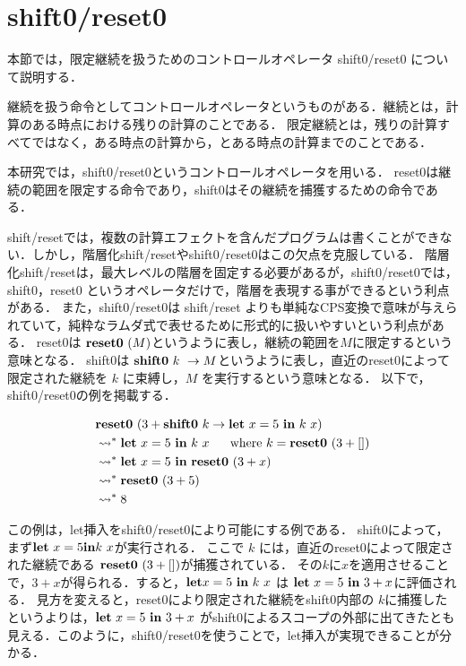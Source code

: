 \section{shift0/reset0}
本節では，限定継続を扱うためのコントロールオペレータ shift0/reset0 について説明する．

継続を扱う命令としてコントロールオペレータというものがある．継続とは，計算のある時点における残りの計算のことである．
限定継続とは，残りの計算すべてではなく，ある時点の計算から，とある時点の計算までのことである．

本研究では，shift0/reset0というコントロールオペレータを用いる．
reset0は継続の範囲を限定する命令であり，shift0はその継続を捕獲するための命令である．

shift/reset\cite{Danvy1990}では，複数の計算エフェクトを含んだプログラムは書くことができない．しかし，階層化shift/resetやshift0/reset0はこの欠点を克服している．
階層化shift/reset\cite{Danvy1990}は，最大レベルの階層を固定する必要があるが，shift0/reset0では，shift0，reset0 というオペレータだけで，階層を表現する事ができるという利点がある．
また，shift0/reset0は shift/reset よりも単純なCPS変換で意味が与えられていて，純粋なラムダ式で表せるために形式的に扱いやすいという利点がある．
reset0は $\textbf{reset0}~ (M)$というように表し，継続の範囲を$M$に限定するという意味となる．
shift0は $\textbf{shift0}~ k~ \to M$というように表し，直近のreset0によって限定された継続を $k$ に束縛し，$M$ を実行するという意味となる．
以下で，shift0/reset0の例を掲載する．

\begin{align*}
  &\textbf{reset0}~ (3 + \textbf{shift0}~ k \to \textbf{let}~ x = 5~ \textbf{in}~ k~ x) \\
  &\leadsto^* \textbf{let}~ x = 5~ \textbf{in}~ k~ x ~~~~~\text{where}~k = \textbf{reset0}~ (3 + []) \\
  &\leadsto^* \textbf{let}~ x = 5~ \textbf{in}~ \textbf{reset0}~ (3 + x) \\
  &\leadsto^* \textbf{reset0}~ (3 + 5) \\
  &\leadsto^* 8 \\
\end{align*}

この例は，let挿入をshift0/reset0により可能にする例である．
shift0によって，まず$\textbf{let}~ x = 5 \textbf{in} k~ x$が実行される．
ここで $k$ には，直近のreset0によって限定された継続である $\textbf{reset0}~ (3 + [])$が捕獲されている．
その$k$に$x$を適用させることで，$3+x$が得られる．すると，$\textbf{let} x = 5~ \textbf{in}~ k~ x$ は $\textbf{let}~ x = 5~ \textbf{in}~ 3 + x$に評価される．
見方を変えると，reset0により限定された継続をshift0内部の $k$に捕獲したというよりは，$\textbf{let}~ x = 5~ \textbf{in}~ 3 + x$ がshift0によるスコープの外部に出てきたとも見える．このように，shift0/reset0を使うことで，let挿入が実現できることが分かる．



